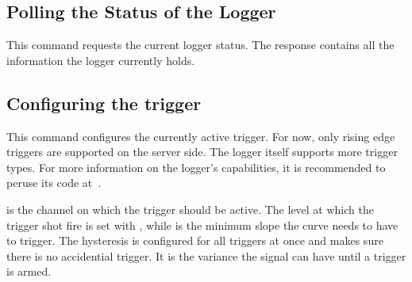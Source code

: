 \subsection{Polling the Status of the Logger} %
\label{subsec:devguide:server:polling_logger}

This command  requests the current  logger status.  The response  contains all
the information the logger currently holds.


\subsection{Configuring the trigger} %
\label{subsec:devguide:server:configuring_trigger}

This command  configures the currently  active trigger.  For now,  only rising
edge triggers  are supported  on the server  side. The logger  itself supports
more trigger types. For  more information on the logger's  capabilities, it is
recommended to peruse its code at~\cite{pita:github:huesser:zynq-logger}.

 is the channel on which the trigger should be active. The level
at which the trigger shot fire is set with , while  is
the  minimum slope  the  curve needs  to have  to  trigger. The hysteresis  is
configured for  all triggers at  once and makes  sure there is  no accidential
trigger. It is the variance the signal can have until a trigger is armed.


